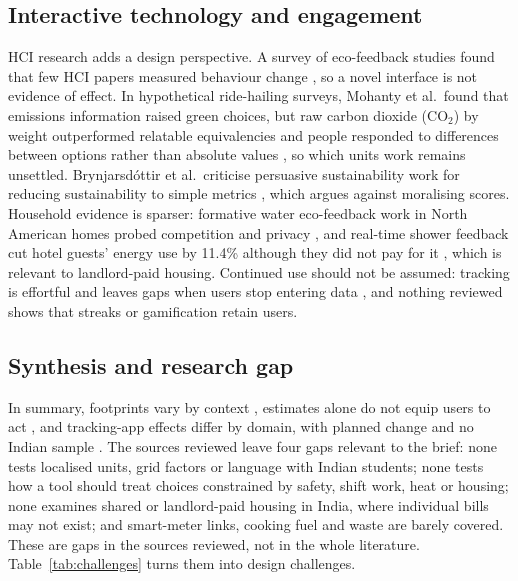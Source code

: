 \documentclass[12pt, a4paper]{article}
\begin{document}
\subsection{Interactive technology and engagement}
HCI research adds a design perspective. A survey of eco-feedback studies found that few HCI papers measured behaviour change \cite{froehlich2010}, so a novel interface is not evidence of effect. In hypothetical ride-hailing surveys, Mohanty et al.\ found that emissions information raised green choices, but raw carbon dioxide (CO$_2$) by weight outperformed relatable equivalencies and people responded to differences between options rather than absolute values \cite{mohanty2023}, so which units work remains unsettled. Brynjarsd\'ottir et al.\ criticise persuasive sustainability work for reducing sustainability to simple metrics \cite{brynjarsdottir2012}, which argues against moralising scores. Household evidence is sparser: formative water eco-feedback work in North American homes probed competition and privacy \cite{froehlich2012}, and real-time shower feedback cut hotel guests' energy use by 11.4\% although they did not pay for it \cite{tiefenbeck2019}, which is relevant to landlord-paid housing. Continued use should not be assumed: tracking is effortful and leaves gaps when users stop entering data \cite{hoffmann2024}, and nothing reviewed shows that streaks or gamification retain users.

\subsection{Synthesis and research gap}
In summary, footprints vary by context \cite{lee2021,gandhi2025}, estimates alone do not equip users to act \cite{mulrow2019,collins2020}, and tracking-app effects differ by domain, with planned change and no Indian sample \cite{hoffmann2024,lasarov2024}. The sources reviewed leave four gaps relevant to the brief: none tests localised units, grid factors or language with Indian students; none tests how a tool should treat choices constrained by safety, shift work, heat or housing; none examines shared or landlord-paid housing in India, where individual bills may not exist; and smart-meter links, cooking fuel and waste are barely covered. These are gaps in the sources reviewed, not in the whole literature. Table~\ref{tab:challenges} turns them into design challenges.
\end{document}

